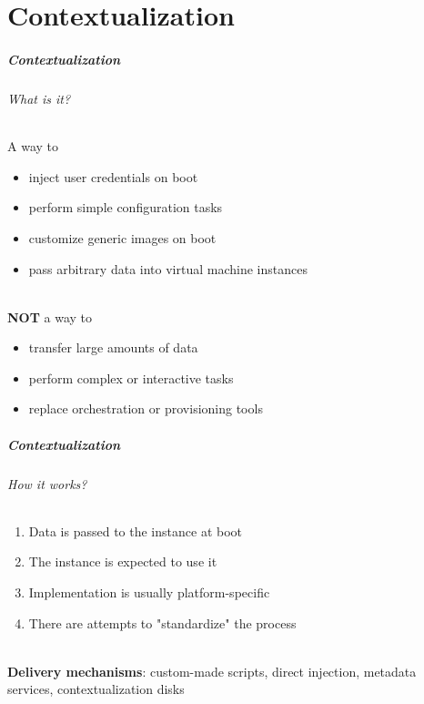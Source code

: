 \label{part_contextualization}
\part{Contextualization}

\begin{frame}
  \frametitle{Contextualization}
  \framesubtitle{What is it?}

  A way to
  \begin{itemize}
    \item inject user credentials on boot
    \item perform simple configuration tasks
    \item customize generic images on boot
    \item pass arbitrary data into virtual machine instances
  \end{itemize}

  \hfill\\

  \textbf{NOT} a way to
  \begin{itemize}
    \item transfer large amounts of data
    \item perform complex or interactive tasks
    \item replace orchestration or provisioning tools
  \end{itemize}
\end{frame}

\begin{frame}
  \frametitle{Contextualization}
  \framesubtitle{How it works?}

  \begin{enumerate}
    \item Data is passed to the instance at boot
    \item The instance is expected to use it
    \item Implementation is usually platform-specific
    \item There are attempts to "standardize" the process
  \end{enumerate}

  \hfill\\

  \textbf{Delivery mechanisms}: custom-made scripts, direct injection, metadata services, contextualization disks
\end{frame}

